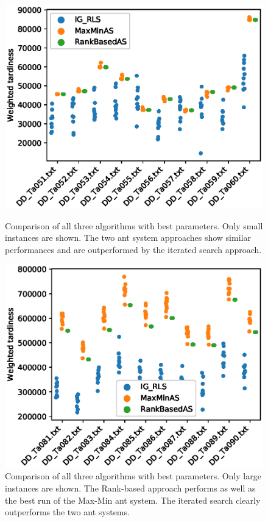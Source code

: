 \documentclass[runningheads]{llncs}
\begin{document}
\begin{figure}
    \centering
    \begin{minipage}{.48\textwidth}
		\centering
		\includegraphics[width=1.1\textwidth]{small-instances-results.eps}
		\caption{Comparison of all three algorithms with best parameters. Only
		small instances are shown. The two ant system approaches show similar
		performances and are outperformed by the iterated search approach.}
		\label{small-instances-results}
    \end{minipage}
    \hspace{0.02\textwidth}
    \begin{minipage}{.48\textwidth}
		\centering
		\includegraphics[width=1.1\textwidth]{large-instances-results.eps}
		\caption{Comparison of all three algorithms with best parameters. Only
		large instances are shown. The Rank-based approach performs as well as
		the best run of the Max-Min ant system. The iterated search clearly
		outperforms the two ant systems.}
		\label{large-instances-results}
    \end{minipage}
\end{figure}
\end{document}
